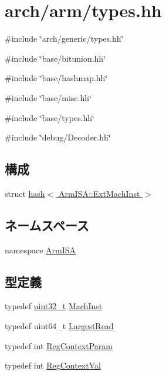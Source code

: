 \hypertarget{arch_2arm_2types_8hh}{
\section{arch/arm/types.hh}
\label{arch_2arm_2types_8hh}
}
{\ttfamily \#include \char`\"{}arch/generic/types.hh\char`\"{}}\par
{\ttfamily \#include \char`\"{}base/bitunion.hh\char`\"{}}\par
{\ttfamily \#include \char`\"{}base/hashmap.hh\char`\"{}}\par
{\ttfamily \#include \char`\"{}base/misc.hh\char`\"{}}\par
{\ttfamily \#include \char`\"{}base/types.hh\char`\"{}}\par
{\ttfamily \#include \char`\"{}debug/Decoder.hh\char`\"{}}\par
\subsection*{構成}
\begin{DoxyCompactItemize}
\item 
struct \hyperlink{structhash_3_01ArmISA_1_1ExtMachInst_01_4}{hash$<$ ArmISA::ExtMachInst $>$}
\end{DoxyCompactItemize}
\subsection*{ネームスペース}
\begin{DoxyCompactItemize}
\item 
namespace \hyperlink{namespaceArmISA}{ArmISA}
\end{DoxyCompactItemize}
\subsection*{型定義}
\begin{DoxyCompactItemize}
\item 
typedef \hyperlink{Type_8hh_a435d1572bf3f880d55459d9805097f62}{uint32\_\-t} \hyperlink{namespaceArmISA_a301c22ea09fa33dcfe6ddf22f203699c}{MachInst}
\item 
typedef uint64\_\-t \hyperlink{namespaceArmISA_a13e8c318dd29afdaf79751a072344db8}{LargestRead}
\item 
typedef int \hyperlink{namespaceArmISA_a88c738aeccc3196d5aa02381432b71b9}{RegContextParam}
\item 
typedef int \hyperlink{namespaceArmISA_a41d04b9cdf89f5fb4b429f3abcee7c6e}{RegContextVal}
\end{DoxyCompactItemize}
